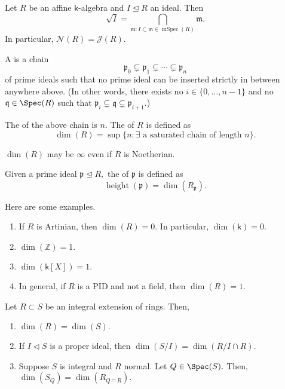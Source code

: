 \documentclass[12pt]{article}	%
\DeclareMathOperator{\mSpec}{mSpec}
\DeclareMathOperator{\htt}{height}
\begin{document}
\begin{cor}
	Let $R$ be an affine $\mathsf{k}$-algebra and $I \unlhd R$ an ideal. Then
	\begin{equation*} 
		\sqrt{I} = \bigcap_{\mathfrak{m} : I \subset \mathfrak{m} \in \mSpec(R)} \mathfrak{m}.
	\end{equation*}
	In particular, $\mathcal{N}(R) = \mathcal{J}(R).$
\end{cor}

\begin{defn}%
	A  is a chain
	\begin{equation*} 
		\mathfrak{p}_0 \subsetneq \mathfrak{p}_1 \subsetneq \cdots \subsetneq \mathfrak{p}_n
	\end{equation*}
	of prime ideals such that no prime ideal can be inserted strictly in between anywhere above. (In other words, there exists no $i \in \{0, \ldots, n - 1\}$ and no $\mathfrak{q} \in \Spec(R)$ such that $\mathfrak{p}_i \subsetneq \mathfrak{q} \subsetneq \mathfrak{p}_{i + 1}.$)

	The  of the above chain is $n.$ The  of $R$ is defined as
	\begin{equation*} 
		\dim(R) = \sup\{n : \exists \text{ a saturated chain of length }n\}.
	\end{equation*}
\end{defn}
$\dim(R)$ may be $\infty$ even if $R$ is Noetherian. 
\begin{defn}%
	Given a prime ideal $\mathfrak{p} \unlhd R,$ the  of $\mathfrak{p}$ is defined as 
	\begin{equation*} 
		\htt(\mathfrak{p}) = \dim(R_\mathfrak{p}).
	\end{equation*}
\end{defn}

\begin{ex}
	Here are some examples.
	\begin{enumerate}
		\item If $R$ is Artinian, then $\dim(R) = 0.$ In particular, $\dim(\mathsf{k}) = 0.$
		\item $\dim(\mathbb{Z}) = 1.$
		\item $\dim(\mathsf{k}[X]) = 1.$
		\item In general, if $R$ is a PID and not a field, then $\dim(R) = 1.$
	\end{enumerate}
\end{ex}

\begin{prop}
	Let $R \subset S$ be an integral extension of rings. Then,
	\begin{enumerate}
		\item $\dim(R) = \dim(S).$
		\item If $I \lhd S$ is a proper ideal, then $\dim(S/I) = \dim(R/I \cap R).$
		\item Suppose $S$ is integral and $R$ normal. Let $Q \in \Spec(S).$ Then, $\dim(S_Q) = \dim(R_{Q \cap R}).$
	\end{enumerate}
\end{prop}
\end{document}
